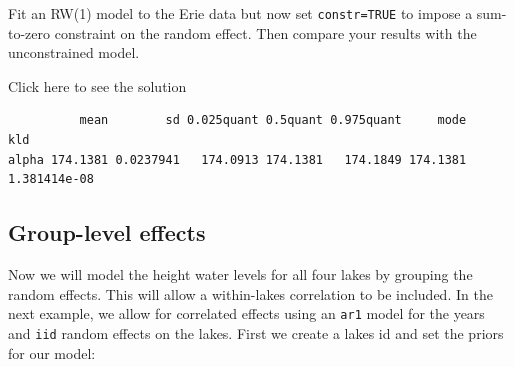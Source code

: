 \documentclass[
  letterpaper,
  DIV=11,
  numbers=noendperiod]{scrartcl}
\newenvironment{Shaded}{\begin{snugshade}}{\end{snugshade}}
\newcommand{\AttributeTok}[1]{\textcolor[rgb]{0.40,0.45,0.13}{#1}}
\newcommand{\CommentTok}[1]{\textcolor[rgb]{0.37,0.37,0.37}{#1}}
\newcommand{\ConstantTok}[1]{\textcolor[rgb]{0.56,0.35,0.01}{#1}}
\newcommand{\DecValTok}[1]{\textcolor[rgb]{0.68,0.00,0.00}{#1}}
\newcommand{\ErrorTok}[1]{\textcolor[rgb]{0.68,0.00,0.00}{#1}}
\newcommand{\FunctionTok}[1]{\textcolor[rgb]{0.28,0.35,0.67}{#1}}
\newcommand{\NormalTok}[1]{\textcolor[rgb]{0.00,0.23,0.31}{#1}}
\newcommand{\OtherTok}[1]{\textcolor[rgb]{0.00,0.23,0.31}{#1}}
\newcommand{\SpecialCharTok}[1]{\textcolor[rgb]{0.37,0.37,0.37}{#1}}
\newcommand{\StringTok}[1]{\textcolor[rgb]{0.13,0.47,0.30}{#1}}
\begin{document}
\begin{tcolorbox}[enhanced jigsaw, opacityback=0, breakable, title={Task}, opacitybacktitle=0.6, colback=white, coltitle=black, toprule=.15mm, bottomrule=.15mm, titlerule=0mm, colbacktitle=quarto-callout-warning-color!10!white, colframe=quarto-callout-warning-color-frame, toptitle=1mm, arc=.35mm, leftrule=.75mm, left=2mm, rightrule=.15mm, bottomtitle=1mm]

Fit an RW(1) model to the Erie data but now set \texttt{constr=TRUE} to
impose a sum-to-zero constraint on the random effect. Then compare your
results with the unconstrained model.

Click here to see the solution

\begin{Shaded}
\end{Shaded}

\begin{verbatim}
          mean        sd 0.025quant 0.5quant 0.975quant     mode          kld
alpha 174.1381 0.0237941   174.0913 174.1381   174.1849 174.1381 1.381414e-08
\end{verbatim}

\end{tcolorbox}

\subsection{Group-level effects}\label{group-level-effects}

Now we will model the height water levels for all four lakes by grouping
the random effects. This will allow a within-lakes correlation to be
included. In the next example, we allow for correlated effects using an
\texttt{ar1} model for the years and \texttt{iid} random effects on the
lakes. First we create a lakes id and set the priors for our model:
\end{document}
